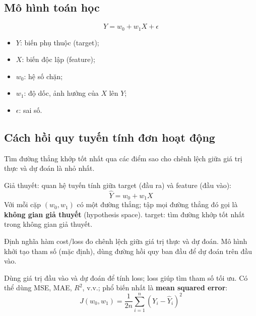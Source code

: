 
\subsection{Mô hình toán học}

\begin{dinhnghia}[title={Phương trình}]
\[
Y = w_0 + w_1 X + \epsilon
\]
\begin{itemize}
  \item $Y$: biến phụ thuộc (target);
  \item $X$: biến độc lập (feature);
  \item $w_0$: hệ số chặn;
  \item $w_1$: độ dốc, ảnh hưởng của $X$ lên $Y$;
  \item $\epsilon$: sai số.
\end{itemize}
\end{dinhnghia}

\subsection{Cách hồi quy tuyến tính đơn hoạt động}

\begin{dongco}[title={target}]
Tìm đường thẳng khớp tốt nhất qua các điểm sao cho chênh lệch giữa giá trị thực và dự đoán là nhỏ nhất.
\end{dongco}

\begin{dinhnghia}[title={Hàm giả thuyết}]
Giả thuyết: quan hệ tuyến tính giữa target (đầu ra) và feature (đầu vào):
\[
\hat{Y} = w_0 + w_1 X
\]
Với mỗi cặp $(w_0, w_1)$ có một đường thẳng; tập mọi đường thẳng đó gọi là \textbf{không gian giả thuyết} (hypothesis space).
target: tìm đường khớp tốt nhất trong không gian giả thuyết.
\end{dinhnghia}

\begin{phuongphap}[title={Tìm đường khớp tốt nhất}]
Định nghĩa hàm cost/loss đo chênh lệch giữa giá trị thực và dự đoán.
Mô hình khởi tạo tham số (mặc định), dùng đường hồi quy ban đầu để dự đoán trên đầu vào.
\end{phuongphap}

\begin{dinhnghia}[title={Hàm mất mát (MSE)}]
Dùng giá trị đầu vào và dự đoán để tính loss; loss giúp tìm tham số tối ưu.
Có thể dùng MSE, MAE, $R^2$, v.v.; phổ biến nhất là \textbf{mean squared error}:
\[
J(w_0, w_1) = \frac{1}{2n} \sum_{i=1}^{n} \left( Y_i - \hat{Y}_i \right)^2
\]
\end{dinhnghia}

